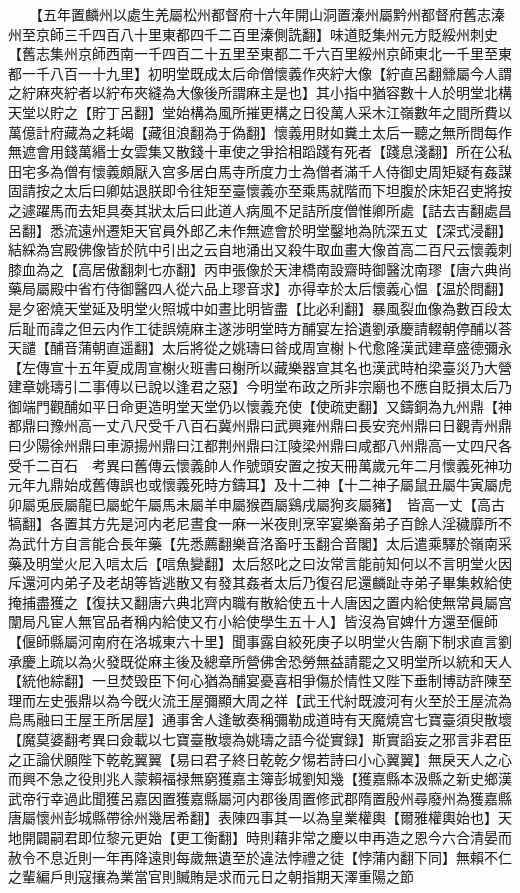　　【五年置麟州以處生羌屬松州都督府十六年開山洞置溱州屬黔州都督府舊志溱州至京師三千四百八十里東都四千二百里溱側詵翻】味道貶集州元方貶綏州刺史【舊志集州京師西南一千四百二十五里至東都二千六百里綏州京師東北一千里至東都一千八百一十九里】初明堂既成太后命僧懷義作夾紵大像【紵直呂翻檾屬今人謂之紵麻夾紵者以紵布夾縫為大像後所謂麻主是也】其小指中猶容數十人於明堂北構天堂以貯之【貯丁呂翻】堂始構為風所摧更構之日役萬人采木江嶺數年之間所費以萬億計府藏為之耗竭【藏徂浪翻為于偽翻】懷義用財如糞土太后一聽之無所問每作無遮會用錢萬緡士女雲集又散錢十車使之爭拾相蹈踐有死者【踐息淺翻】所在公私田宅多為僧有懷義頗厭入宫多居白馬寺所度力士為僧者滿千人侍御史周矩疑有姦謀固請按之太后曰卿姑退朕即令往矩至臺懷義亦至乘馬就階而下坦腹於床矩召吏將按之遽躍馬而去矩具奏其狀太后曰此道人病風不足詰所度僧惟卿所處【詰去吉翻處昌呂翻】悉流遠州遷矩天官員外郎乙未作無遮會於明堂鑿地為阬深五丈【深式浸翻】結綵為宫殿佛像皆於阬中引出之云自地涌出又殺牛取血畫大像首高二百尺云懷義刺膝血為之【高居傲翻刺七亦翻】丙申張像於天津橋南設齋時御醫沈南璆【唐六典尚藥局屬殿中省冇侍御醫四人從六品上璆音求】亦得幸於太后懷義心愠【温於問翻】是夕密燒天堂延及明堂火照城中如晝比明皆盡【比必利翻】暴風裂血像為數百段太后耻而諱之但云内作工徒誤燒麻主遂涉明堂時方酺宴左拾遺劉承慶請輟朝停酺以荅天譴【酺音蒲朝直遥翻】太后將從之姚璹曰㫺成周宣榭卜代愈隆漢武建章盛德彌永【左傳宣十五年夏成周宣榭火班書曰榭所以藏樂器宣其名也漢武時柏梁臺災乃大營建章姚璹引二事傅以已說以逢君之惡】今明堂布政之所非宗廟也不應自貶損太后乃御端門觀酺如平日命更造明堂天堂仍以懷義充使【使疏吏翻】又鑄銅為九州鼎【神都鼎曰豫州高一丈八尺受千八百石冀州鼎曰武興雍州鼎曰長安兖州鼎曰日觀青州鼎曰少陽徐州鼎曰車源揚州鼎曰江都荆州鼎曰江陵梁州鼎曰咸都八州鼎高一丈四尺各受千二百石　考異曰舊傳云懷義帥人作號頭安置之按天冊萬歲元年二月懷義死神功元年九鼎始成舊傳誤也或懷義死時方鑄耳】及十二神【十二神子屬鼠丑屬牛寅屬虎卯屬兎辰屬龍巳屬蛇午屬馬未屬羊申屬猴酉屬鷄戌屬狗亥屬豬】　皆高一丈【高古犒翻】各置其方先是河内老尼晝食一麻一米夜則烹宰宴樂畜弟子百餘人淫穢靡所不為武什方自言能合長年藥【先悉薦翻樂音洛畜吁玉翻合音閣】太后遣乘驛於嶺南采藥及明堂火尼入唁太后【唁魚變翻】太后怒叱之曰汝常言能前知何以不言明堂火因斥還河内弟子及老胡等皆逃散又有發其姦者太后乃復召尼還麟趾寺弟子畢集敕給使掩捕盡獲之【復扶又翻唐六典北齊内職有散給使五十人唐因之置内給使無常員屬宫闈局凡宦人無官品者稱内給使又冇小給使學生五十人】皆沒為官婢什方還至偃師【偃師縣屬河南府在洛城東六十里】聞事露自絞死庚子以明堂火告廟下制求直言劉承慶上疏以為火發既從麻主後及總章所營佛舍恐勞無益請罷之又明堂所以統和天人【統他綜翻】一旦焚毁臣下何心猶為酺宴憂喜相爭傷於情性又陛下垂制博訪許陳至理而左史張鼎以為今旣火流王屋彌顯大周之祥【武王代紂既渡河有火至於王屋流為烏馬融曰王屋王所居屋】通事舍人逢敏奏稱彌勒成道時有天魔燒宫七寶臺須臾散壞【魔莫婆翻考異曰僉載以七寶臺散壞為姚璹之語今從實録】斯實謟妄之邪言非君臣之正論伏願陛下乾乾翼翼【易曰君子終日乾乾夕惕若詩曰小心翼翼】無戾天人之心而興不急之役則兆人蒙賴福禄無窮獲嘉主簿彭城劉知幾【獲嘉縣本汲縣之新史鄉漢武帝行幸過此聞獲呂嘉因置獲嘉縣屬河内郡後周置修武郡隋置殷州尋廢州為獲嘉縣唐屬懷州彭城縣帶徐州幾居希翻】表陳四事其一以為皇業權輿【爾雅權輿始也】天地開闢嗣君即位黎元更始【更工衡翻】時則藉非常之慶以申再造之恩今六合清晏而赦令不息近則一年再降遠則每歲無遺至於違法悖禮之徒【悖蒲内翻下同】無賴不仁之輩編戶則寇攘為業當官則贓賄是求而元日之朝指期天澤重陽之節